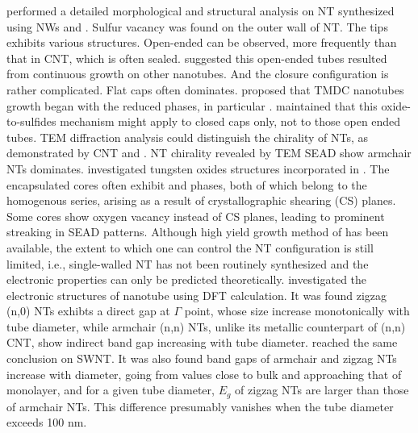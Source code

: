 \citeauthor{Zhu2000} performed a detailed morphological and structural analysis on  NT synthesized using  NWs and . \cite{Zhu2000} Sulfur vacancy was found on the outer wall of NT. The tips exhibits various structures. Open-ended can be observed, more frequently than that in CNT, which is often sealed. \citeauthor{Zhu2000} suggested this open-ended tubes resulted from continuous growth on other nanotubes. And the closure configuration is rather complicated. Flat caps often dominates. \citeauthor{Feldman1996} proposed that TMDC nanotubes growth began with the reduced  phases, in particular .\cite{Feldman1996} \citeauthor{Zhu2000} maintained that this oxide-to-sulfides mechanism might apply to closed caps only, not to those open ended tubes.\cite{Zhu2000} TEM diffraction analysis could distinguish the chirality of NTs, as demonstrated by CNT \cite{Zhang1993} and \cite{MARGULIS1996}.  NT chirality revealed by TEM SEAD show armchair NTs dominates. \citeauthor{Sloan1999} investigated tungsten oxides structures incorporated in .\cite{Sloan1999} The encapsulated  cores often exhibit  and  phases, both of which belong to the  homogenous series, arising as a result of crystallographic shearing (CS) planes.\cite{Miyano} Some  cores show oxygen vacancy instead of CS planes, leading to prominent streaking in SEAD patterns. Although high yield growth method of  has been available, the extent to which one can control the NT configuration is still limited, i.e., single-walled NT has not been routinely synthesized and the electronic properties can only be predicted theoretically. \citeauthor{Seifert2000} investigated the electronic structures of  nanotube using DFT calculation.\cite{Seifert2000} It was found zigzag (n,0) NTs exhibts a direct gap at $\Gamma$ point, whose size increase monotonically with tube diameter, while armchair (n,n) NTs, unlike its metallic counterpart of (n,n) CNT, show indirect band gap increasing with tube diameter. \citeauthor{Zibouche2012} reached the same conclusion on  SWNT.\cite{Zibouche2012} It was also found band gaps of armchair and zigzag NTs increase with diameter, going from values close to bulk and approaching that of  monolayer, and for a given tube diameter, $E_g$ of zigzag NTs are larger than those of armchair NTs. This difference presumably vanishes when the tube diameter exceeds 100 nm.

